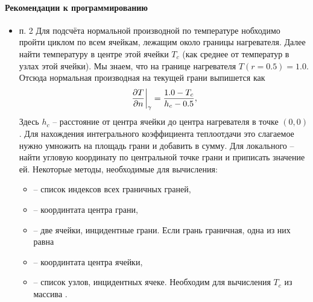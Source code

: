 \paragraph{Рекомендации к программированию}
\begin{itemize}
\item п. 2
Для подсчёта нормальной производной по температуре нобходимо
пройти циклом по всем ячейкам, лежащим около границы нагревателя.
Далее найти температуру в центре этой ячейки $T_c$ (как среднее от температур в узлах этой ячейки).
Мы знаем, что на границе нагревателя $T(r=0.5) = 1.0$.
Отсюда нормальная производная на текущей грани выпишется как
\begin{equation*}
\left.\frac{\partial T}{\partial n}\right|_\gamma = \frac{1.0 - T_c}{h_c - 0.5},
\end{equation*}
Здесь $h_c$ -- расстояние от центра ячейки до центра нагревателя в точке $(0, 0)$.
Для нахождения интегрального коэффициента теплоотдачи это слагаемое нужно умножить
на площадь грани и добавить в сумму. Для локального -- найти угловую координату по центральной точке грани и приписать значение ей.
Некоторые методы, необходимые для вычисления:
\begin{itemize}
\item {} -- список индексов всех граничных граней, 
\item {} -- координтата центра грани,
\item {} -- две ячейки, инцидентные грани. Если грань граничная, одна из них равна 
\item {} -- координтата центра ячейки,
\item {} -- список узлов, инцидентных ячеке. Необходим для вычисления $T_c$ из массива .
\end{itemize}


\end{itemize}
